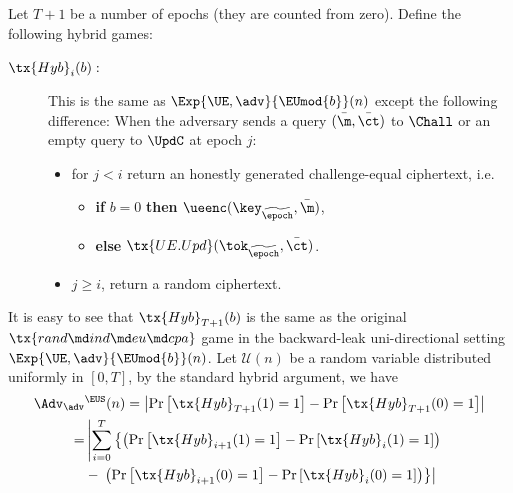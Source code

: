 \documentclass{fundam}
\begin{document}
Let $T+1$ be a number of epochs (they are counted from zero). Define the following hybrid games: 
\begin{description}
	\item[$\tx{Hyb}_{i}(b):$] This is the same as $\Exp{\UE,\adv}{\EUmod{b}}(n)$ except the following difference: When the adversary sends a query $(\bar{\m}, \bar{\ct})$ to $\Chall$ or an empty query to $\UpdC$ at epoch $j$:
	\begin{itemize}
		\item for $j<i$ return an honestly generated challenge-equal ciphertext, i.e. 
		\begin{itemize}
			\item[{}] \textbf{if} $b=0$ \textbf{then} $\ueenc(\key_{\widetilde{\epoch}}, \bar{\m})$,
			\item[{}] \textbf{else} $\tx{UE.Upd}(\tok_{\widetilde{\epoch}}, \bar{\ct})$. 
		\end{itemize}
		\item $j\geq i$, return a random ciphertext.
	\end{itemize}
\end{description}
It is easy to see that $\tx{Hyb}_{T+1}(b)$ is the same as the original $\tx{rand\md ind\md eu\md cpa}$	game in the backward-leak uni-directional setting $\Exp{\UE,\adv}{\EUmod{b}}(n)$. Let $\mathcal{U} (n)$ be a random variable distributed uniformly in $[0,T]$, by the standard hybrid argument, we have
\begin{align*}
	\Adv_{\adv}&^{\EUS}(n) = \left| \Pr\left[ \tx{Hyb}_{T+1}(1)=1 \right]   -  \Pr\left[ \tx{Hyb}_{T+1}(0)=1 \right]   \right| \nonumber\\
	=&\left|  \sum_{i=0}^{T} \left\{   \left(  \Pr\left[   \tx{Hyb}_{i+1}(1)=1 \right]   -   \Pr\left[   \tx{Hyb}_{i}(1)=1 \right] \right) \right. \right. \nonumber\\
	& -   \left.\left. \left(  \Pr\left[   \tx{Hyb}_{i+1}(0)=1 \right]   -   \Pr\left[   \tx{Hyb}_{i}(0)=1 \right] \right)   \right\} \right|  
\end{align*}	
%
\end{document}
